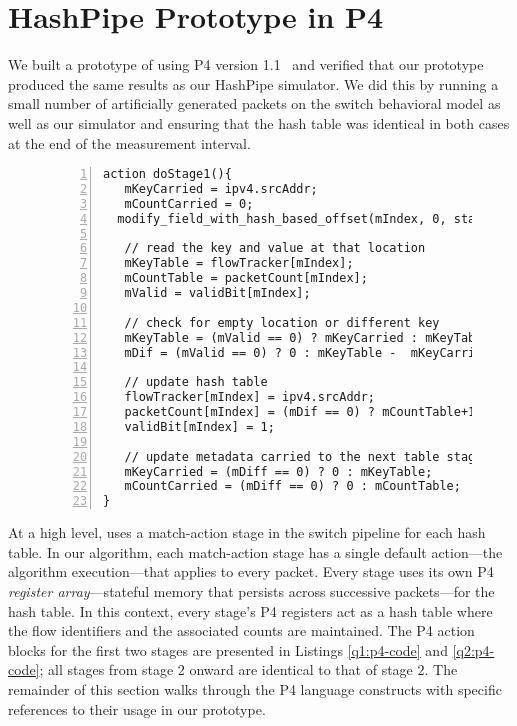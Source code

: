 \section{HashPipe Prototype in P4}
\label{sec:prototype}


We built a prototype of \TheSystem using P4 version 1.1~\cite{p4-v1.1-spec} and verified that our prototype produced the same results as our HashPipe simulator. We did this by running a small number of artificially generated packets on the switch behavioral model \cite{p4-bm} as well as our simulator and ensuring that the hash table was identical in both cases at the end of the measurement interval.


\begin{figure}
 \begin{lstlisting}[basicstyle=\footnotesize, caption=
  First HashPipe stage with insertion of new flow. Fields prefixed with m are metadata fields, label=q1:p4-code, captionpos=b, basicstyle=\footnotesize, breaklines = true,
numbers=left, xleftmargin=2em,frame=single,framexleftmargin=2.0em]
 action doStage1(){
   mKeyCarried = ipv4.srcAddr;
   mCountCarried = 0;
  modify_field_with_hash_based_offset(mIndex, 0, stage1Hash, 32);

   // read the key and value at that location
   mKeyTable = flowTracker[mIndex];
   mCountTable = packetCount[mIndex];
   mValid = validBit[mIndex];

   // check for empty location or different key
   mKeyTable = (mValid == 0) ? mKeyCarried : mKeyTable;
   mDif = (mValid == 0) ? 0 : mKeyTable -  mKeyCarried;

   // update hash table
   flowTracker[mIndex] = ipv4.srcAddr;
   packetCount[mIndex] = (mDif == 0) ? mCountTable+1: 1;
   validBit[mIndex] = 1;

   // update metadata carried to the next table stage
   mKeyCarried = (mDiff == 0) ? 0 : mKeyTable;
   mCountCarried = (mDiff == 0) ? 0 : mCountTable;  
}
 \end{lstlisting}
 \end{figure}

At a high level, \TheSystem uses a match-action stage in the switch pipeline for each hash table. In our algorithm, each match-action stage has a single default action---the algorithm execution---that applies to every packet. Every stage uses its own P4 \emph{register array}---stateful memory that persists across successive packets---for the hash table. In this context, every stage's P4 registers act as a hash table where the flow identifiers and the associated counts are maintained. The P4 action blocks for the first two stages are presented in Listings \ref{q1:p4-code} and \ref{q2:p4-code}; all stages from stage $2$ onward are identical to that of stage $2$. The remainder of this section walks through the P4 language constructs with specific references to their usage in our \TheSystem prototype.\\

